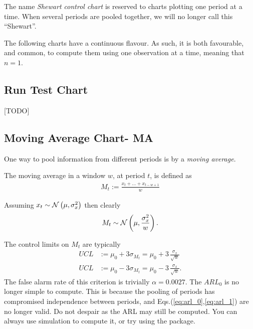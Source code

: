 \begin{remark}
The name \emph{Shewart control chart} is reserved to charts plotting one period at a time. 
When several periods are pooled together, we will no longer call this  ``Shewart''.
\end{remark}

\begin{remark}
The following charts have a continuous flavour. As such, it is both favourable, and common, to compute them using one observation at a time, meaning that $n=1$. 
\end{remark}



\subsection{Run Test Chart}
[TODO]




\subsection[MA]{Moving Average Chart- MA}
One way to pool information from different periods is by a \emph{moving average}.
\begin{definition}
The moving average in a window $w$, at period $t$, is defined as
\begin{align}
	M_t:= \frac{x_t+\dots+x_{t-w+1}}{w}
\end{align}
\end{definition}
Assuming $x_t \sim \mathcal{N}\left(\mu, \sigma_x^2\right)$ then clearly 
\begin{align}
	M_t \sim \mathcal{N}\left(\mu, \frac{\sigma_x^2}{w}\right).
\end{align}

The control limits on $M_t$ are typically
\begin{align}
	UCL &:= \mu_0 + 3 \sigma_{M_t}= \mu_0 + 3 \, \frac{\sigma_x}{\sqrt{w}} \\
	UCL &:= \mu_0 - 3 \sigma_{M_t}= \mu_0 - 3 \, \frac{\sigma_x}{\sqrt{w}}.
\end{align}
The false alarm rate of this criterion is trivially $\alpha=0.0027$. 
The $ARL_0$ is no longer simple to compute. 
This is because the pooling of periods has compromised independence between periods, and Eqs.(\ref{eq:arl_0},\ref{eq:arl_1}) are no longer valid. 
Do not despair as the ARL may still be computed. 
You can always use simulation to compute it, or try using the  \R package.


